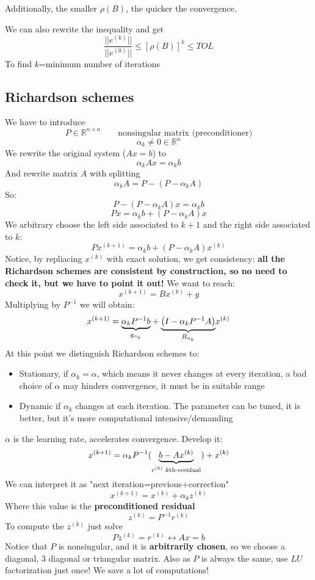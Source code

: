     Additionally, the smaller $\rho(B)$, the quicker the convergence.

    We can also rewrite the inequality and get
    $$
    \frac{||e^{(k)}||}{||e^{(0)}||}\leq
    \left[\rho(B)\right]^k
    \leq
    TOL
    $$
    To find $k$=minimum number of iterations

\subsection{Richardson schemes}
    We have to introduce
    $$
    P\in\mathbb{R}^{n\times n}\qquad\text{nonsingular matrix (preconditioner)}
    $$
    $$
    \alpha_k\neq 0\in\mathbb{R}^{n}
    $$
    We rewrite the original system ($Ax=b$) to
    $$
    \alpha_kAx=\alpha_kb
    $$
    And rewrite matrix $A$ with splitting
    $$
    \alpha_kA=P-(P-\alpha_kA)
    $$
    So:
    $$
    P-(P-\alpha_kA)x=\alpha_kb
    $$
    $$
    Px=\alpha_kb+(P-\alpha_kA)x
    $$
    We arbitrary choose the left side associated to $k+1$ and the right side associated to $k$:
    $$
    Px^{(k+1)}=\alpha_kb+(P-\alpha_kA)x^{(k)}
    $$
    Notice, by repliacing $x^{(k)}$ with exact solution, we get consistency: \textbf{all the Richardson schemes are consistent by construction, so no need to check it, but we have to point it out!}
    We want to reach:
    $$
    x^{(k+1)}=Bx^{(k)}+g
    $$
    Multiplying by $P^{-1}$ we will obtain:
    $$
    x^{(k+1)}=
    \underlabel{\alpha_kP^{-1}b}{$g_{\alpha_k}$}+
    \underlabel{\left(
        I-\alpha_kP^{-1}A
    \right)}{$B_{\alpha_k}$}x^{(k)}
    $$
    At this point we distinguish Richardson schemes to:
    \begin{itemize}
        \item Stationary, if $\alpha_k=\alpha$, which means it never changes at every iteration, a bad choice of $\alpha$ may hinders convergence, it must be in suitable range
        \item Dynamic if $\alpha_k$ changes at each iteration. The parameter can be tuned, it is better, but it's more computational intensive/demanding
    \end{itemize}
    $\alpha$ is the learning rate, accelerates convergence.
    Develop it:
    $$
    x^{(k+1)}=
    \alpha_kP^{-1}(
        \underlabel{
            b-Ax^{(k)}
        }{$r^{(k)}$ $k$th-residual}
    )+x^{(k)}
    $$
    We can interpret it as "next iteration=previous+correction"
    $$
    x^{(k+1)}=x^{(k)}+\alpha_kz^{(k)}
    $$
    Where this value is the \textbf{preconditioned residual}
    $$
    z^{(k)}=P^{-1}r^{(k)}
    $$
    To compute the $z^{(k)}$ just solve
    $$
    Pz^{(k)}=r^{(k)}\leftrightarrow Ax=b
    $$
    Notice that $P$ is nonsingular, and it is \textbf{arbitrarily chosen}, so we choose a diagonal, 3 diagonal or triangular matrix. Also as $P$ is always the same, use $LU$ factorization just once! We save a lot of computations!

